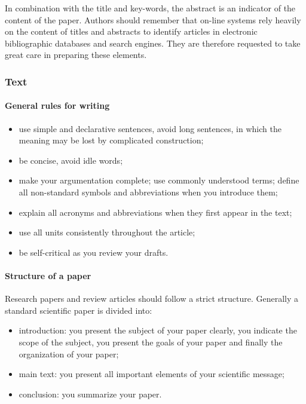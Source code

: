 \documentclass[USenglish,oneside,twocolumn]{article}
\begin{document}
In combination with the title and key-words, the abstract is an indicator of the content of the paper. Authors should remember that on-line systems rely heavily on the content of titles and abstracts to identify articles in electronic bibliographic databases and search engines. They are therefore requested to take great care in preparing these elements.


\subsubsection{Text}

\paragraph{General rules for writing}
\begin{itemize}
\item use simple and declarative sentences, avoid long sentences, in which the meaning may be lost by complicated construction;
\item be concise, avoid idle words;
\item make your argumentation complete; use commonly understood terms; define all non-standard symbols and abbreviations when you introduce them;
\item explain all acronyms and abbreviations when they first appear in the text;
\item use all units consistently throughout the article;
\item be self-critical as you review your drafts.
\end{itemize}

\paragraph{Structure of a paper}
    Research papers and review articles should follow a strict structure. Generally a standard scientific paper is divided into:
\begin{itemize}
\item introduction: you present the subject of your paper clearly, you indicate the scope of the subject, you present the goals of your paper and finally the organization of your paper;
\item main text: you present all important elements of your scientific message;
\item conclusion: you summarize your paper.
\end{itemize}
\end{document}
